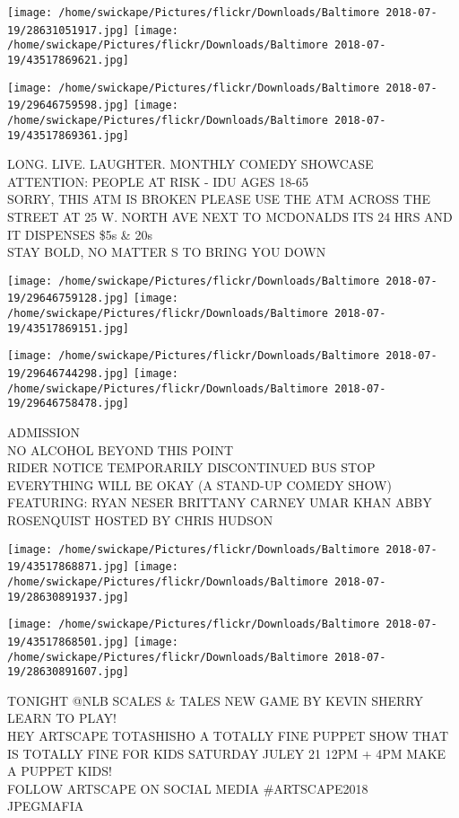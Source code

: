 \documentclass[10pt,letterpaper]{article}
\begin{document}
\texttt{[image: /home/swickape/Pictures/flickr/Downloads/Baltimore 2018-07-19/28631051917.jpg]}
\texttt{[image: /home/swickape/Pictures/flickr/Downloads/Baltimore 2018-07-19/43517869621.jpg]}

\texttt{[image: /home/swickape/Pictures/flickr/Downloads/Baltimore 2018-07-19/29646759598.jpg]}
\texttt{[image: /home/swickape/Pictures/flickr/Downloads/Baltimore 2018-07-19/43517869361.jpg]}

LONG. LIVE. LAUGHTER.  MONTHLY COMEDY SHOWCASE\\
ATTENTION: PEOPLE AT RISK {-} IDU AGES 18{-}65\\
SORRY, THIS ATM IS BROKEN PLEASE USE THE ATM ACROSS THE STREET AT 25 W. NORTH AVE NEXT TO MCDONALDS ITS 24 HRS AND IT DISPENSES \$5s \& 20s\\
STAY BOLD, NO MATTER S TO BRING YOU DOWN\\
\pagebreak

\texttt{[image: /home/swickape/Pictures/flickr/Downloads/Baltimore 2018-07-19/29646759128.jpg]}
\texttt{[image: /home/swickape/Pictures/flickr/Downloads/Baltimore 2018-07-19/43517869151.jpg]}

\texttt{[image: /home/swickape/Pictures/flickr/Downloads/Baltimore 2018-07-19/29646744298.jpg]}
\texttt{[image: /home/swickape/Pictures/flickr/Downloads/Baltimore 2018-07-19/29646758478.jpg]}

ADMISSION\\
NO ALCOHOL BEYOND THIS POINT\\
RIDER NOTICE TEMPORARILY DISCONTINUED BUS STOP\\
EVERYTHING WILL BE OKAY (A STAND{-}UP COMEDY SHOW) FEATURING: RYAN NESER BRITTANY CARNEY UMAR KHAN ABBY ROSENQUIST HOSTED BY CHRIS HUDSON\\
\pagebreak

\texttt{[image: /home/swickape/Pictures/flickr/Downloads/Baltimore 2018-07-19/43517868871.jpg]}
\texttt{[image: /home/swickape/Pictures/flickr/Downloads/Baltimore 2018-07-19/28630891937.jpg]}

\texttt{[image: /home/swickape/Pictures/flickr/Downloads/Baltimore 2018-07-19/43517868501.jpg]}
\texttt{[image: /home/swickape/Pictures/flickr/Downloads/Baltimore 2018-07-19/28630891607.jpg]}

TONIGHT @NLB SCALES \& TALES NEW GAME BY KEVIN SHERRY LEARN TO PLAY!\\
HEY ARTSCAPE TOTASHISHO A TOTALLY FINE PUPPET SHOW THAT IS TOTALLY FINE FOR KIDS SATURDAY JULEY 21 12PM + 4PM MAKE A PUPPET KIDS!\\
FOLLOW ARTSCAPE ON SOCIAL MEDIA \#ARTSCAPE2018\\
JPEGMAFIA\\
\pagebreak
\end{document}

